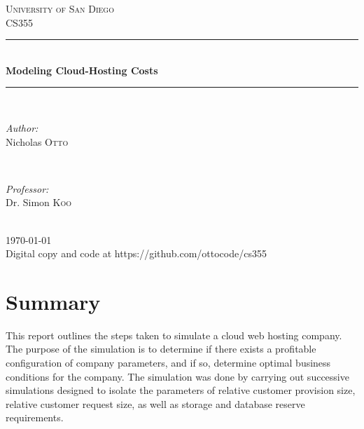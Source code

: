 \documentclass[12pt]{article} %
\begin{document}

\begin{titlepage}

\newcommand{\HRule}{\rule{\linewidth}{0.5mm}} %

\center %

\textsc{\LARGE University of San Diego}\\[1.5cm] %
\textsc{\Large CS355}\\[0.5cm] %

\HRule \\[0.4cm]
{ \huge \bfseries Modeling Cloud-Hosting Costs}\\[0.4cm] %
\HRule \\[1.5cm]

\begin{minipage}{0.4\textwidth}
\begin{flushleft} \large
\emph{Author:}\\
Nicholas \textsc{Otto} %
\end{flushleft}
\end{minipage}
~
\begin{minipage}{0.4\textwidth}
\begin{flushright} \large
\emph{Professor:} \\
Dr. Simon \textsc{Koo} %
\end{flushright}
\end{minipage}\\[4cm]

{\large \today}\\[3cm] %


\vfill %
Digital copy and code at https://github.com/ottocode/cs355

\end{titlepage}
\section{Summary}
This report outlines the steps taken to simulate a cloud web hosting company.  
The purpose of the simulation is to determine if there exists a profitable configuration of company parameters, and if so, determine optimal business conditions for the company.  
The simulation was done by carrying out successive simulations designed to isolate the parameters of relative customer provision size, relative customer request size, as well as storage and database reserve requirements.
\end{document}
